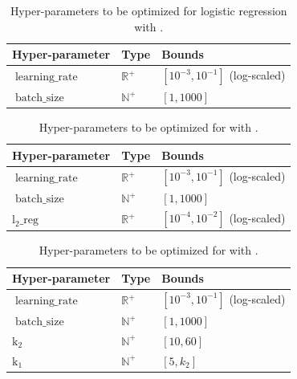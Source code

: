 \documentclass[twoside,11pt]{article}
\begin{document}
\begin{table}[ht]
\centering
\begin{tabular}{@{}lll@{}}
\toprule
\textbf{Hyper-parameter} & \textbf{Type}                      & \textbf{Bounds}               \\ \midrule
$\operatorname{learning\_rate}$                & $\mathbb{R}^+$ & $\left[ 10^{-3}, 10^{-1} \right]$ (log-scaled) \\
$\operatorname{batch\_size}$           & $\mathbb{N}^+$ & $\left[1, 1000 \right]$         \\ \bottomrule
\end{tabular}
\caption{Hyper-parameters to be optimized for logistic regression with \SGD.}
\label{logistic_sgd}
\end{table}

\begin{table}[ht]
\centering
\begin{tabular}{@{}lll@{}}
\toprule
\textbf{Hyper-parameter} & \textbf{Type}                      & \textbf{Bounds}               \\ \midrule
$\operatorname{learning\_rate}$                & $\mathbb{R}^+$ & $\left[ 10^{-3}, 10^{-1} \right]$ (log-scaled) \\
$\operatorname{batch\_size}$           & $\mathbb{N}^+$ & $\left[1, 1000 \right]$         \\ 
$\operatorname{l_2\_reg}$		& $\mathbb{R}^+$ & $\left[ 10^{-4}, 10^{-2} \right]$ (log-scaled) \\ \bottomrule
\end{tabular}
\caption{Hyper-parameters to be optimized for \MLP with \SGD.}
\label{mlp_sgd}
\end{table}

\begin{table}[ht]
\centering
\begin{tabular}{@{}lll@{}}
\toprule
\textbf{Hyper-parameter} & \textbf{Type}                      & \textbf{Bounds}               \\ \midrule
$\operatorname{learning\_rate}$                & $\mathbb{R}^+$ & $\left[ 10^{-3}, 10^{-1} \right]$ (log-scaled) \\
$\operatorname{batch\_size}$           & $\mathbb{N}^+$ & $\left[1, 1000 \right]$         \\
$\operatorname{k_2}$           & $\mathbb{N}^+$ & $\left[10,  60 \right]$         \\
$\operatorname{k_1}$           & $\mathbb{N}^+$ & $\left[5,  k_2 \right]$         \\ \bottomrule
\end{tabular}
\caption{Hyper-parameters to be optimized for \CNN with \SGD.}
\label{cnn_sgd}
\end{table}
\end{document}
